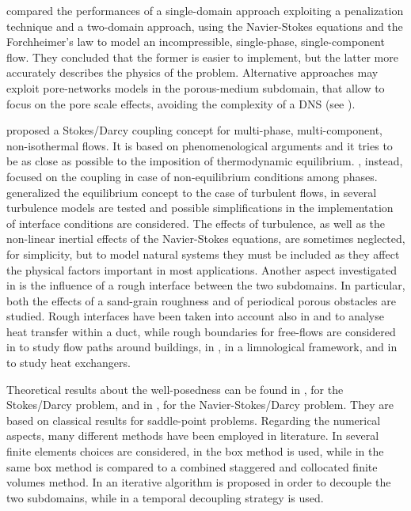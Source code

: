 \textcite{intro:discacim} compared the performances of a single-domain approach exploiting a penalization technique and a 
two-domain approach, using the Navier-Stokes equations and the Forchheimer's 
law to model an incompressible, single-phase, single-component flow. They 
concluded that the former is easier to implement, but the latter more accurately describes the physics of the problem. Alternative approaches may exploit 
pore-networks models in the porous-medium subdomain, that allow to focus on the 
pore scale effects, avoiding the complexity of a DNS (see \cite{paper:kilian}).

\textcite{paper:mosthaf} proposed a Stokes/Darcy coupling concept for multi-phase, 
multi-component, non-isothermal flows. It is based on phenomenological arguments and it tries to be as close as possible to the 
imposition of thermodynamic equilibrium. \textcite{intro:davarzani}, instead, focused on the coupling in case of non-equilibrium conditions among phases.
\textcite{paper:fetzer} generalized the equilibrium concept to the case of 
turbulent flows, in \cite{tesi:fetzer} several turbulence models are tested and 
possible simplifications in the implementation of interface conditions are 
considered. The effects of turbulence, as well as the non-linear inertial 
effects of the Navier-Stokes equations, are sometimes neglected, for 
simplicity, 
but to model natural systems they must be included as they
affect the physical factors important in most applications.
Another aspect investigated in 
\cite{tesi:fetzer} is the influence of a rough interface between the two 
subdomains. In particular, both the effects of a sand-grain roughness and of 
periodical porous obstacles are studied.
Rough interfaces have been taken into account also in \cite{intro:kuzbek} and \cite{intro:kuz} to analyse heat transfer within a duct, while rough boundaries for free-flows are considered in \cite{lien:obstacles} to study flow paths around buildings, in \cite{intro:limnology}, in a limnological framework, and in \cite{intro:targui} to study heat exchangers.

Theoretical results about the well-posedness can be found in \cite{intro:disca}, for the Stokes/Darcy problem, and in \cite{intro:disca2009}, for the Navier-Stokes/Darcy problem. They are based on classical results for saddle-point problems. Regarding the numerical aspects, many different methods have been employed in literature. In \cite{intro:disca2009} several finite elements choices are considered, in \cite{tesi:mosthaf} the box method is used, while in \cite{tesi:fetzer} the same box method is compared to a combined staggered and collocated finite volumes method. In \cite{intro:disca} an iterative algorithm is proposed in order to decouple the two subdomains, while in \cite{intro:rybak} a temporal decoupling strategy is used.

